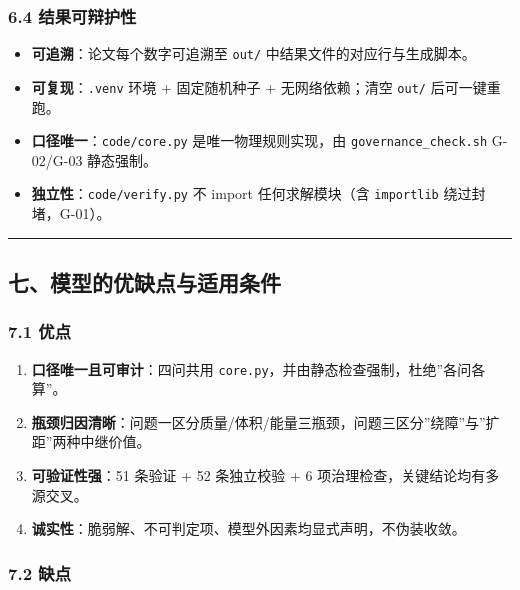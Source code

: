 \documentclass[
  10.5pt,
]{extarticle}
\providecommand{\tightlist}{%
  \setlength{\itemsep}{0pt}\setlength{\parskip}{0pt}}
\begin{document}
\subsubsection{6.4
结果可辩护性}\label{ux7ed3ux679cux53efux8fa9ux62a4ux6027}

\begin{itemize}
\tightlist
\item
  \textbf{可追溯}：论文每个数字可追溯至 \texttt{out/}
  中结果文件的对应行与生成脚本。
\item
  \textbf{可复现}：\texttt{.venv} 环境 + 固定随机种子 + 无网络依赖；清空
  \texttt{out/} 后可一键重跑。
\item
  \textbf{口径唯一}：\texttt{code/core.py} 是唯一物理规则实现，由
  \texttt{governance\_check.sh} G-02/G-03 静态强制。
\item
  \textbf{独立性}：\texttt{code/verify.py} 不 import 任何求解模块（含
  \texttt{importlib} 绕过封堵，G-01）。
\end{itemize}

\begin{center}\rule{0.5\linewidth}{0.5pt}\end{center}

\subsection{七、模型的优缺点与适用条件}\label{ux4e03ux6a21ux578bux7684ux4f18ux7f3aux70b9ux4e0eux9002ux7528ux6761ux4ef6}

\subsubsection{7.1 优点}\label{ux4f18ux70b9}

\begin{enumerate}
\def\labelenumi{\arabic{enumi}.}
\tightlist
\item
  \textbf{口径唯一且可审计}：四问共用
  \texttt{core.py}，并由静态检查强制，杜绝''各问各算''。
\item
  \textbf{瓶颈归因清晰}：问题一区分质量/体积/能量三瓶颈，问题三区分''绕障''与''扩距''两种中继价值。
\item
  \textbf{可验证性强}：51 条验证 + 52 条独立校验 + 6
  项治理检查，关键结论均有多源交叉。
\item
  \textbf{诚实性}：脆弱解、不可判定项、模型外因素均显式声明，不伪装收敛。
\end{enumerate}

\subsubsection{7.2 缺点}\label{ux7f3aux70b9}
\end{document}

